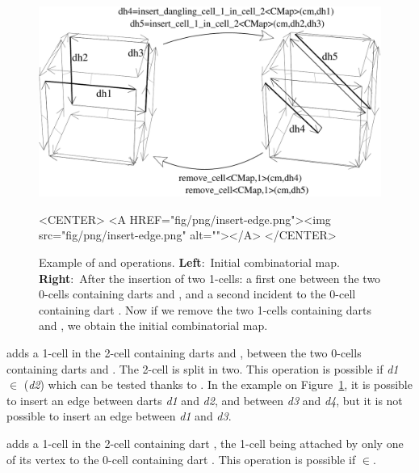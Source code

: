 \begin{figure}[htb]
  \begin{ccTexOnly}
    \begin{center}
      \includegraphics[width=.72\textwidth]{Combinatorial_map/fig/pdf/insert-edge}
    \end{center}
  \end{ccTexOnly}
  \begin{ccHtmlOnly}
    <CENTER> <A HREF="fig/png/insert-edge.png"><img
    src="fig/png/insert-edge.png" alt=""></A> </CENTER>
  \end{ccHtmlOnly}
  \caption{Example of  and
     operations. \textbf{Left}:~Initial
    combinatorial map.  \textbf{Right}:~After the insertion of two
    1-cells: a first one between the two 0-cells containing darts
     and , and a second incident to the 0-cell
    containing dart . Now if we remove the two
    1-cells containing darts  and , we obtain the
    initial combinatorial map.}
  \label{fig-insert-edge}
\end{figure}
{} adds a 1-cell in
the 2-cell containing darts  and , between the two
0-cells containing darts  and . The 2-cell is split
in two. This operation is possible if \emph{d1} $\in$ \orbit{\betaun{}}(\emph{d2})
which can be tested thanks to
.  In the example on
Figure~\ref{fig-insert-edge}, it is possible to insert an edge
between darts \emph{d1} and \emph{d2}, and between \emph{d3} and \emph{d4}, but it is
not possible to insert an edge between \emph{d1} and \emph{d3}.

{} adds a 1-cell in
the 2-cell containing dart , the 1-cell being attached by only
one of its vertex to the 0-cell containing dart .
This operation is possible if $\in$.

